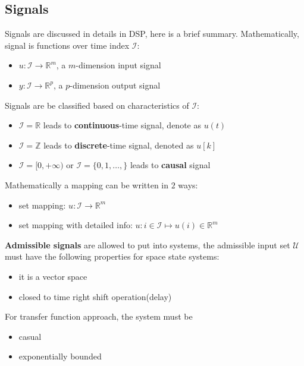 \documentclass[10pt,a4paper,oneside]{article}
\begin{document}
\subsection{Signals}
Signals are discussed in details in DSP, here is a brief summary. Mathematically, signal is functions over time index $\mathcal{I}$:
\begin{itemize}
	\item $u: \mathcal{I} \rightarrow \mathbb{R}^m$, a $m$-dimension input signal
	\item $y: \mathcal{I} \rightarrow \mathbb{R}^p$, a $p$-dimension output signal
\end{itemize}
Signals are be classified based on characteristics of $\mathcal{I}$:
\begin{itemize}
	\item $\mathcal{I} = \mathbb{R}$ leads to \textbf{continuous}-time signal, denote as $u(t)$
	\item $\mathcal{I} = \mathbb{Z}$ leads to \textbf{discrete}-time signal, denoted as $u[k]$
	\item $\mathcal{I}=[0, +\infty)$ or $\mathcal{I}=\{0, 1, \dots,\}$ leads to \textbf{causal} signal
\end{itemize}
Mathematically a mapping can be written in $2$ ways:
\begin{itemize}
	\item set mapping: $u: \mathcal{I} \rightarrow \mathbb{R}^m$
	\item set mapping with detailed info: $u: i \in \mathcal{I} \mapsto u(i) \in \mathbb{R}^m$
\end{itemize}
\textbf{Admissible signals} are allowed to put into systems, the admissible input set $\mathcal{U}$ must have the following properties for space state systems:
\begin{itemize}
	\item it is a vector space
	\item closed to time right shift operation(delay)
\end{itemize}
For transfer function approach, the system must be
\begin{itemize}
	\item casual
	\item exponentially bounded
\end{itemize} 
\end{document}
